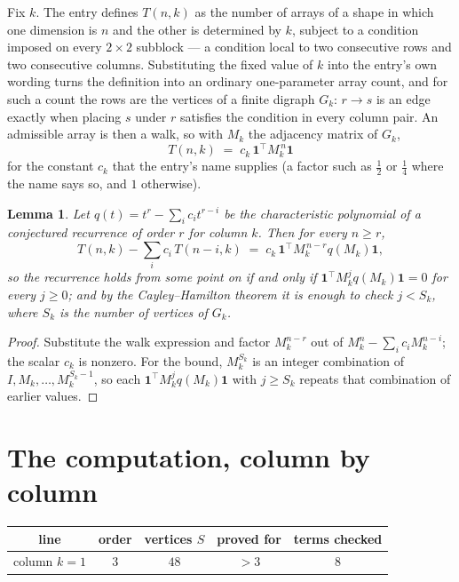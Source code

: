 \documentclass[11pt,a4paper]{article}
\theoremstyle{plain}
\newtheorem{lemma}[theorem]{Lemma}
\theoremstyle{definition}
\begin{document}
Fix $k$. The entry defines $T(n,k)$ as the number of arrays of a shape in which one dimension
is $n$ and the other is determined by $k$, subject to a condition imposed on every
$2\times2$ subblock --- a condition local to two consecutive rows and two consecutive columns.
Substituting the fixed value of $k$ into the entry's own wording turns the definition into an
ordinary one-parameter array count, and for such a count the rows are the vertices of a finite
digraph $G_k$: $r\to s$ is an edge exactly when placing $s$ under $r$ satisfies the condition
in every column pair. An admissible array is then a walk, so with $M_k$ the adjacency matrix
of $G_k$,
\[
T(n,k)\;=\;c_k\,\mathbf{1}^{\!\top}M_k^{\,n}\mathbf{1}
\]
for the constant $c_k$ that the entry's name supplies (a factor such as $\tfrac12$ or
$\tfrac14$ where the name says so, and $1$ otherwise).

\begin{lemma}\label{lem:crit}
Let $q(t)=t^{r}-\sum_i c_it^{r-i}$ be the characteristic polynomial of a conjectured
recurrence of order $r$ for column $k$. Then for every $n\ge r$,
\[
T(n,k)-\sum_i c_i\,T(n-i,k)\;=\;c_k\,\mathbf{1}^{\!\top}M_k^{\,n-r}q(M_k)\mathbf{1},
\]
so the recurrence holds from some point on if and only if
$\mathbf{1}^{\!\top}M_k^{j}q(M_k)\mathbf{1}=0$ for every $j\ge0$; and by the
Cayley--Hamilton theorem it is enough to check $j<S_k$, where $S_k$ is the number of vertices
of $G_k$.
\end{lemma}

\begin{proof}
Substitute the walk expression and factor $M_k^{n-r}$ out of $M_k^{n}-\sum_ic_iM_k^{n-i}$;
the scalar $c_k$ is nonzero. For the bound, $M_k^{S_k}$ is an integer combination of
$I,M_k,\dots,M_k^{S_k-1}$, so each $\mathbf{1}^{\!\top}M_k^{j}q(M_k)\mathbf{1}$ with
$j\ge S_k$ repeats that combination of earlier values.
\end{proof}

\section{The computation, column by column}

\begin{center}
\begin{tabular}{ccccc}
line & order & vertices $S$ & proved for & terms checked \\ \hline
column $k$$=1$ & $3$ & $48$ & $>3$ & $8$ \\
\end{tabular}
\end{center}
\end{document}
